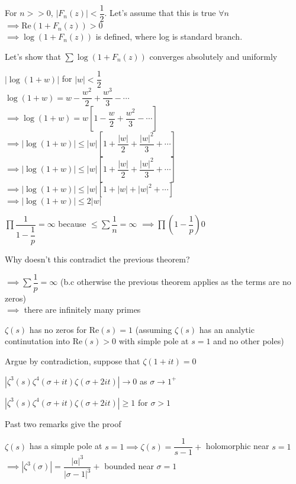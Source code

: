 \documentclass[twoside, 10pt]{article}
\renewcommand{\Re}{\text{Re}}
\begin{document}
For $n >> 0$, $|F_n(z)| < \dfrac{1}{2}$.
Let's assume that this is true $\forall n$\\
$\implies \Re(1 + F_n(z)) > 0$\\
$\implies \log(1 + F_n(z))$ is defined, where log is standard branch.

Let's show that $\sum \log(1 + F_n(z))$ converges absolutely and uniformly

$| \log(1 + w)|$ for $|w| < \dfrac{1}{2}$\\
$\log(1 + w) = w - \dfrac{w^2}{2} + \dfrac{w^3}{3} - \cdots$\\
$\implies \log(1 + w) = w [1- \dfrac{w}{2} + \dfrac{w^2}{3} - \cdots ]$\\
$\implies |\log(1 + w)| \leq |w| [1+ \dfrac{|w|}{2} + \dfrac{|w|^2}{3} + \cdots ]$\\
$\implies |\log(1 + w)| \leq |w| [1+ \dfrac{|w|}{2} + \dfrac{|w|^2}{3} + \cdots ]$\\
$\implies |\log(1 + w)| \leq |w| [1+ |w| + |w|^2 + \cdots ]$\\ 
$\implies |\log(1 + w)| \leq 2|w|$

$\prod \dfrac{1}{1-\dfrac{1}{p}} = \infty$ because $ \leq \sum \dfrac{1}{n} = \infty$
$\implies \prod (1 - \dfrac{1}{p}) 0$

Why doesn't this contradict the previous theorem?

$\implies \sum \dfrac{1}{p} = \infty$ (b.c otherwise the previous theorem applies as the terms are no zeros)\\
$\implies$ there are infinitely many primes

\begin{thm}
   $\zeta(s)$ has no zeros for $\Re(s) = 1$ (assuming $\zeta(s)$ has an analytic continutation into $\Re(s) > 0$ with simple pole at $s = 1$ and no other poles)
\end{thm}

Argue by contradiction, suppose that $\zeta(1 + it) = 0$

\begin{rmk}
   $|\zeta^3(s)\zeta^4(\sigma + it)\zeta(\sigma + 2it)| \to 0$ as $\sigma \to 1^+$
\end{rmk}

\begin{rmk}
   $|\zeta^3(s)\zeta^4(\sigma + it)\zeta(\sigma + 2it)| \geq 1$ for $\sigma > 1$
\end{rmk}

Past two remarks give the proof

\begin{rmk}
   $\zeta(s)$ has a simple pole at $s = 1 \implies \zeta(s) = \dfrac{1}{s-1} +$ holomorphic near $s = 1$\\
   $\implies |\zeta^3(\sigma)| = \dfrac{|a|^3}{|\sigma -1|^3} +$ bounded near $\sigma = 1$
\end{rmk}
\end{document}
